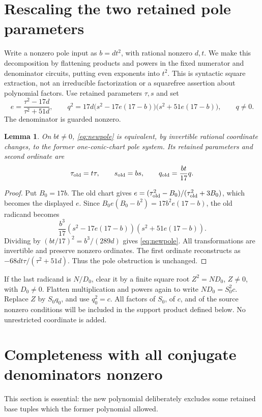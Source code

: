 \documentclass[11pt,a4paper]{article}
\newtheorem{lemma}[theorem]{Lemma}
\theoremstyle{remark}\newtheorem{remark}[theorem]{Remark}
\begin{document}
\section{Rescaling the two retained pole parameters}\label{sec:poles}
Write a nonzero pole input as $b=d t^2$, with rational nonzero $d,t$.
We make this decomposition by flattening products and powers in the
fixed numerator and denominator circuits, putting even exponents into
$t^2$. This is syntactic square extraction, not an irreducible
factorization or a squarefree assertion about polynomial factors.
Use retained parameters $\tau,s$ and set
\begin{equation}\label{eq:newpole}
 e=\frac{\tau^2-17d}{\tau^2+51d},\qquad
 q^2=17d\bigl(s^2-17e(17-b)\bigr)
                  \bigl(s^2+51e(17-b)\bigr),\qquad q\ne0.
\end{equation}
The denominator is guarded nonzero.

\begin{lemma}\label{lem:rescale}
On $bt\ne0$, \eqref{eq:newpole} is equivalent, by invertible rational
coordinate changes, to the former one-conic-chart pole system. Its
retained parameters and second ordinate are
\[
 \tau_{\rm old}=t\tau,\qquad s_{\rm old}=bs,
 \qquad q_{\rm old}=\frac{bt}{17}q.
\]
\end{lemma}
\begin{proof}
Put $B_0=17b$. The old chart gives
$e=(\tau_{\rm old}^2-B_0)/(\tau_{\rm old}^2+3B_0)$,
which becomes the displayed $e$. Since
$B_0e(B_0-b^2)=17b^2e(17-b)$, the old radicand becomes
\[
 \frac{b^3}{17}
       (s^2-17e(17-b))(s^2+51e(17-b)).
\]
Dividing by $(bt/17)^2=b^3/(289d)$ gives \eqref{eq:newpole}.
All transformations are invertible and preserve nonzero ordinates.
The first ordinate reconstructs as
$-68dt\tau/(\tau^2+51d)$. Thus the pole obstruction is unchanged.
\end{proof}

If the last radicand is $N/D_0$, clear it by a finite square root
$Z^2=ND_0$, $Z\ne0$, with $D_0\ne0$. Flatten multiplication and powers
again to write $ND_0=S_0^2c$. Replace $Z$ by $S_0q_0$, and use
$q_0^2=c$. All factors of $S_0$, of $c$, and of the source nonzero
conditions will be included in the support product defined below.
No unrestricted coordinate is added.

\section{Completeness with all conjugate denominators nonzero}\label{sec:density}
This section is essential: the new polynomial deliberately excludes
some retained base tuples which the former polynomial allowed.
\end{document}
